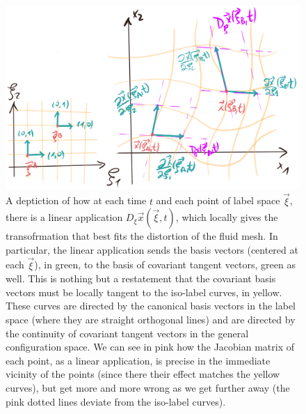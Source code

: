 \documentclass[11pt, a4paper]{article} %
\begin{document}
\begin{figure}[h!]
  \centering
    \includegraphics[width=0.65\linewidth]{4each_locality.png}
  \caption{A deptiction of how at each time $t$ and each point of label space $\vec{\xi}$, there is a linear application $D_\xi\vec{x}(\vec{\xi},t)$, which locally gives the transofrmation that best fits the distortion of the fluid mesh. In particular, the linear application sends the basis vectors (centered at each $\vec{\xi}$), in green, to the basis of covariant tangent vectors, green as well. This is nothing but a restatement that the covariant basis vectors must be locally tangent to the iso-label curves, in yellow. These curves are directed by the canonical basis vectors in the label space (where they are straight orthogonal lines) and are directed by the continuity of covariant tangent vectors in the general configuration space. We can see in pink how the Jacobian matrix of each point, as a linear application, is precise in the immediate vicinity of the points (since there their effect matches the yellow curves), but get more and more wrong as we get further away (the pink dotted lines deviate from the iso-label curves). }
  \label{fig:localContinuum}
\end{figure}
\end{document}
